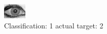 \begin{figure}[h!]
\begin{center}
\includegraphics[width=0.60\columnwidth]{figures/ID2011_class_1_target_2.png}
\end{center}
\caption{ Classification: 1 actual target: 2}
\label{fig:ID2011_class_1_target_2}
\end{figure}
